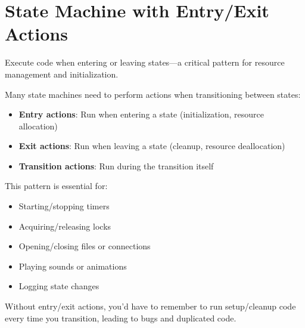 \section{State Machine with Entry/Exit Actions}

Execute code when entering or leaving states---a critical pattern for resource management and initialization.

Many state machines need to perform actions when transitioning between states:
\begin{itemize}
    \item \textbf{Entry actions}: Run when entering a state (initialization, resource allocation)
    \item \textbf{Exit actions}: Run when leaving a state (cleanup, resource deallocation)
    \item \textbf{Transition actions}: Run during the transition itself
\end{itemize}

This pattern is essential for:
\begin{itemize}
    \item Starting/stopping timers
    \item Acquiring/releasing locks
    \item Opening/closing files or connections
    \item Playing sounds or animations
    \item Logging state changes
\end{itemize}

Without entry/exit actions, you'd have to remember to run setup/cleanup code every time you transition, leading to bugs and duplicated code.

